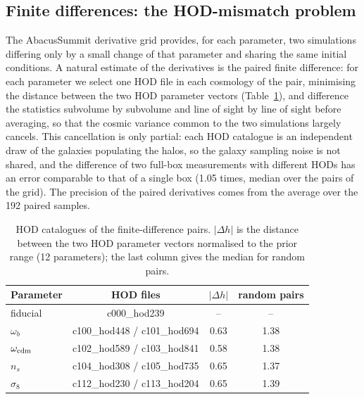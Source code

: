 \documentclass[11pt,twocolumn]{article}
\begin{document}
\subsection{Finite differences: the HOD-mismatch problem}
\label{sec:finitediff}

The AbacusSummit derivative grid provides, for each parameter, two simulations differing only by a small change of that parameter and sharing the same initial conditions. A natural estimate of the derivatives is the paired finite difference: for each parameter we select one HOD file in each cosmology of the pair, minimising the distance between the two HOD parameter vectors (Table~\ref{tab:hods}), and difference the statistics subvolume by subvolume and line of sight by line of sight before averaging, so that the cosmic variance common to the two simulations largely cancels. This cancellation is only partial: each HOD catalogue is an independent draw of the galaxies populating the halos, so the galaxy sampling noise is not shared, and the difference of two full-box measurements with different HODs has an error comparable to that of a single box (1.05 times, median over the pairs of the grid). The precision of the paired derivatives comes from the average over the 192 paired samples.

\begin{table}[!htbp]
\centering\small
\begin{tabular}{lccc}
\toprule
Parameter & HOD files & $|\Delta h|$ & random pairs \\
\midrule
fiducial & c000\_hod239 & -- & -- \\
$\omega_b$ & c100\_hod448 / c101\_hod694 & 0.63 & 1.38 \\
$\omega_{\rm cdm}$ & c102\_hod589 / c103\_hod841 & 0.58 & 1.38 \\
$n_s$ & c104\_hod308 / c105\_hod735 & 0.65 & 1.37 \\
$\sigma_8$ & c112\_hod230 / c113\_hod204 & 0.65 & 1.39 \\
\bottomrule
\end{tabular}
\caption{HOD catalogues of the finite-difference pairs. $|\Delta h|$ is the distance between the two HOD parameter vectors normalised to the prior range (12 parameters); the last column gives the median for random pairs.}
\label{tab:hods}
\end{table}
\end{document}
